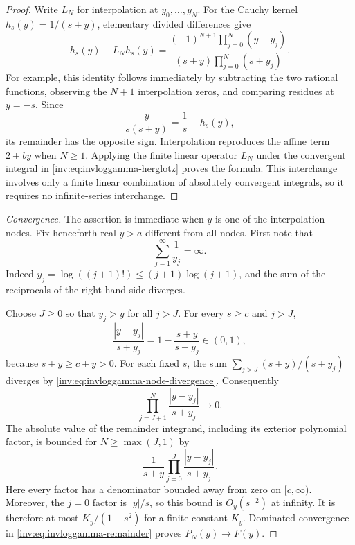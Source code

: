 \documentclass[11pt,a4paper]{article}
\theoremstyle{definition}
\theoremstyle{remark}
\numberwithin{equation}{section}
\begin{document}
\begin{proof}
Write $L_N$ for interpolation at $y_0,\ldots,y_N$.
For the Cauchy kernel $h_s(y)=1/(s+y)$, elementary divided differences
give
\[
 h_s(y)-L_Nh_s(y)
 =\frac{(-1)^{N+1}\prod_{j=0}^{N}(y-y_j)}
             {(s+y)\prod_{j=0}^{N}(s+y_j)}.
\]
For example, this identity follows immediately by subtracting the two
rational functions, observing the $N+1$ interpolation zeros, and
comparing residues at $y=-s$.
Since
\[
 \frac{y}{s(s+y)}=\frac1s-h_s(y),
\]
its remainder has the opposite sign. Interpolation reproduces the
affine term $2+by$ when $N\geq1$. Applying the finite linear operator
$L_N$ under the convergent integral in
\eqref{inv:eq:invloggamma-herglotz} proves the formula. This interchange
involves only a finite linear combination of absolutely convergent
integrals, so it requires no infinite-series interchange.
\end{proof}

\begin{proof}[Convergence]
The assertion is immediate when $y$ is one of the interpolation nodes.
Fix henceforth real $y>a$ different from all nodes.
First note that
\begin{equation}\label{inv:eq:invloggamma-node-divergence}
 \sum_{j=1}^{\infty}\frac1{y_j}=\infty.
\end{equation}
Indeed $y_j=\log((j+1)!)\leq(j+1)\log(j+1)$, and the sum of the
reciprocals of the right-hand side diverges.

Choose $J\geq0$ so that $y_j>y$ for all $j>J$. For every $s\geq c$
and $j>J$,
\[
 \frac{|y-y_j|}{s+y_j}
 =1-\frac{s+y}{s+y_j}\in(0,1),
\]
because $s+y\geq c+y>0$. For each fixed $s$, the sum
$\sum_{j>J}(s+y)/(s+y_j)$ diverges by
\eqref{inv:eq:invloggamma-node-divergence}. Consequently
\[
 \prod_{j=J+1}^{N}\frac{|y-y_j|}{s+y_j}\longrightarrow0.
\]
The absolute value of the remainder integrand, including its exterior
polynomial factor, is bounded for $N\geq\max(J,1)$ by
\[
 \frac1{s+y}\prod_{j=0}^{J}\frac{|y-y_j|}{s+y_j}.
\]
Here every factor has a denominator bounded away from zero on
$[c,\infty)$. Moreover, the $j=0$ factor is $|y|/s$, so this bound is
$O_y(s^{-2})$ at infinity. It is therefore at most
$K_y/(1+s^2)$ for a finite constant $K_y$.
Dominated convergence in \eqref{inv:eq:invloggamma-remainder} proves
$P_N(y)\to F(y)$.
\end{proof}
\end{document}
